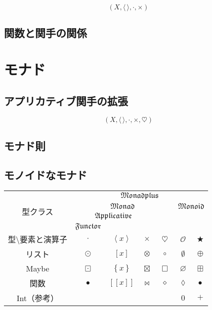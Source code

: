 \documentclass[twocolumn]{jsbook}
\def\[{[\![}
\def\]{]\!]}
\newcommand{\typeclassname}[1]{\mathfrak{#1}}
\newcommand{\typeclassapplicative}{\typeclassname{Applicative}}
\newcommand{\typeclassfunctor}{\typeclassname{Functor}}
\newcommand{\typeclassmonad}{\typeclassname{Monad}}
\newcommand{\typeclassmonadplus}{\typeclassname{Monadplus}}
\newcommand{\typeclassmonoid}{\typeclassname{Monoid}}
\newcommand{\anonymousparameter}{\lozenge}
\newcommand{\constantempty}{\emptyset}
\newcommand{\constantnothing}{\varnothing}
\newcommand{\binaryadd}{+}
\newcommand{\binarycompose}{\bullet}
\newcommand{\binaryfunctormap}{\cdot}
\newcommand{\binaryapplicativemap}{\times}
\newcommand{\binarymonadmap}{\heartsuit}%
\newcommand{\binarylistfunctormap}{\odot}
\newcommand{\binarylistapplicativemap}{\otimes}
\newcommand{\binarylistmonadmap}{\circ}%
\newcommand{\binarylistappend}{\oplus}
\newcommand{\binarymaybefunctormap}{\boxdot}
\newcommand{\binarymaybeapplicativemap}{\boxtimes}
\newcommand{\binarymaybemonadmap}{\Box}%
\newcommand{\binarymaybeappend}{\boxplus}
\newcommand{\binaryfunctionfunctormap}{\binarycompose}
\newcommand{\binaryfunctionapplicativemap}{\Join}%
\newcommand{\binaryfunctionmonadmap}{\diamond}%
\newcommand{\applicativetype}[1]{\left\langle#1\right\rangle}
\newcommand{\listtype}[1]{\left[#1\right]}
\newcommand{\maybetype}[1]{\left\{#1\right\}}
\newcommand{\functyontype}[1]{\[#1\]}
\newcommand{\mathbinaryop}{\bigstar}
\newcommand{\mathidentity}{\mathcal{O}}
\begin{document}
$$(X,\langle\,\rangle,\binaryfunctormap,\times)$$


\section{関数と関手の関係}

\chapter{モナド}

\section{アプリカティブ関手の拡張}

$$(X,\langle\,\rangle,\binaryfunctormap,\times,\heartsuit)$$


\section{モナド則}

\section{モノイドなモナド}


\begin{table*}
\begin{center}
\begin{tabular}{||c||c|c|c|c|c|c||}
\hline
\multirow{4}{*}{型クラス}
    &\multicolumn{6}{|c||}{$\typeclassmonadplus$}\\
\cline{2-7}
\multirow{3}{*}{}
    &\multicolumn{4}{|c|}{$\typeclassmonad$}
    &\multicolumn{2}{|c||}{$\typeclassmonoid$}\\
\cline{2-4}
\multirow{2}{*}{}
    &\multicolumn{3}{|c|}{$\typeclassapplicative$}
    &
    &\multicolumn{2}{|c||}{ }\\
\cline{2-2}
{ }
    &\multicolumn{1}{|c|}{$\typeclassfunctor$}
    &\multicolumn{2}{|c|}{ }
    &
    &\multicolumn{2}{|c||}{ }\\
\hline\hline
型$\setminus$要素と演算子
    &$\binaryfunctormap$
    &$\applicativetype{x}$
    &$\binaryapplicativemap$
    &$\binarymonadmap$
    &$\mathidentity$
    &$\mathbinaryop$\\
\hline
リスト
    &$\binarylistfunctormap$
    &$\listtype{x}$
    &$\binarylistapplicativemap$
    &$\binarylistmonadmap$
    &$\constantempty$
    &$\binarylistappend$\\
\hline
Maybe
    &$\binarymaybefunctormap$
    &$\maybetype{x}$
    &$\binarymaybeapplicativemap$
    &$\binarymaybemonadmap$
    &$\constantnothing$
    &$\binarymaybeappend$\\
\hline
関数
    &$\binaryfunctionfunctormap$
    &$\functyontype{x}$
    &$\binaryfunctionapplicativemap$
    &$\binaryfunctionmonadmap$
    &$\anonymousparameter$
    &$\binarycompose$\\
\hline
Int（参考）
    &
    &
    &
    &
    &$0$
    &$\binaryadd$\\
\hline
\end{tabular}
\end{center}
\end{table*}
\end{document}
